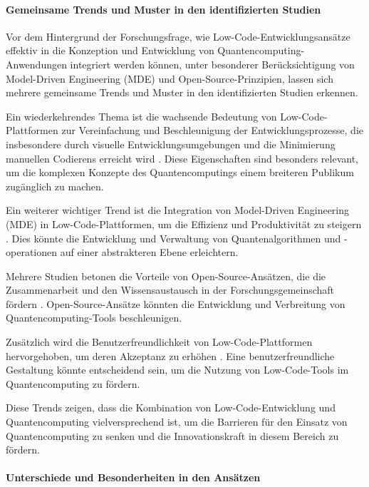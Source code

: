 \paragraph{Gemeinsame Trends und Muster in den identifizierten Studien}

Vor dem Hintergrund der Forschungsfrage, wie Low-Code-Entwicklungsansätze effektiv in die Konzeption 
und Entwicklung von Quantencomputing-Anwendungen integriert werden können, unter besonderer Berücksichtigung 
von Model-Driven Engineering (MDE) und Open-Source-Prinzipien, lassen sich mehrere gemeinsame Trends und 
Muster in den identifizierten Studien erkennen.

Ein wiederkehrendes Thema ist die wachsende Bedeutung von Low-Code-Plattformen zur Vereinfachung und 
Beschleunigung der Entwicklungsprozesse, die insbesondere durch visuelle Entwicklungsumgebungen und 
die Minimierung manuellen Codierens erreicht wird \cite{Khorram_2020, Sahay_2020, Bock_2021}. Diese 
Eigenschaften sind besonders relevant, um die komplexen Konzepte des Quantencomputings einem breiteren Publikum zugänglich zu machen.

Ein weiterer wichtiger Trend ist die Integration von Model-Driven Engineering (MDE) in Low-Code-Plattformen, 
um die Effizienz und Produktivität zu steigern \cite{Gemeinhardt_2021, Moin_2021, Pérez-Castillo_2022}. 
Dies könnte die Entwicklung und Verwaltung von Quantenalgorithmen und -operationen auf einer abstrakteren Ebene erleichtern.

Mehrere Studien betonen die Vorteile von Open-Source-Ansätzen, die die Zusammenarbeit und den Wissensaustausch 
in der Forschungsgemeinschaft fördern \cite{Amato_2023, Gemeinhardt_2023}. Open-Source-Ansätze könnten die 
Entwicklung und Verbreitung von Quantencomputing-Tools beschleunigen.

Zusätzlich wird die Benutzerfreundlichkeit von Low-Code-Plattformen hervorgehoben, um deren Akzeptanz zu erhöhen \cite{Pinho_2022, Prinz_2021}. 
Eine benutzerfreundliche Gestaltung könnte entscheidend sein, um die Nutzung von Low-Code-Tools im Quantencomputing zu fördern.

Diese Trends zeigen, dass die Kombination von Low-Code-Entwicklung und Quantencomputing vielversprechend ist, um die 
Barrieren für den Einsatz von Quantencomputing zu senken und die Innovationskraft in diesem Bereich zu fördern.

\paragraph{Unterschiede und Besonderheiten in den Ansätzen}

